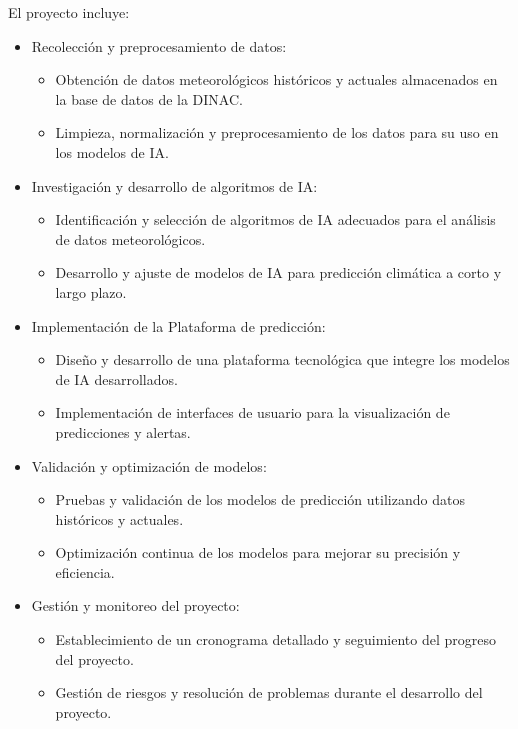 \documentclass[
11pt, %
codirector, %
]{charter}
\begin{document}
El proyecto incluye:
\begin{itemize}
	\item Recolección y preprocesamiento de datos:
		\begin{itemize}
		\item Obtención de datos meteorológicos históricos y actuales almacenados en la base de
datos de la DINAC.
		\item Limpieza, normalización y preprocesamiento de los datos para su uso en los modelos de IA.
		\end{itemize}
	\item Investigación y desarrollo de algoritmos de IA:
		\begin{itemize}
		\item Identificación y selección de algoritmos de IA adecuados para el análisis de datos meteorológicos.
		\item Desarrollo y ajuste de modelos de IA para predicción climática a corto y largo plazo.
		\end{itemize}
	\item Implementación de la Plataforma de predicción:
		\begin{itemize}
		\item Diseño y desarrollo de una plataforma tecnológica que integre los modelos de IA desarrollados.
		\item Implementación de interfaces de usuario para la visualización de predicciones y alertas.
		\end{itemize}
	\item Validación y optimización de modelos:
		\begin{itemize}
		\item Pruebas y validación de los modelos de predicción utilizando datos históricos y actuales.
		\item Optimización continua de los modelos para mejorar su precisión y eficiencia.
		\end{itemize}
	\item Gestión y monitoreo del proyecto:
		\begin{itemize}
		\item Establecimiento de un cronograma detallado y seguimiento del progreso del proyecto.
		\item Gestión de riesgos y resolución de problemas durante el desarrollo del proyecto.
		\end{itemize}
	
\end{itemize}
\end{document}
